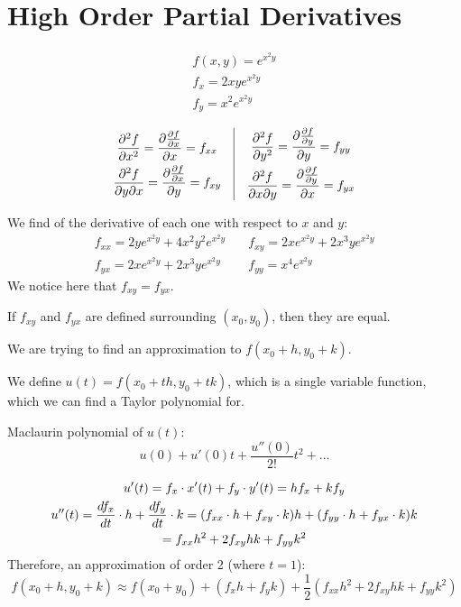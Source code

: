 \documentclass[00_complete]{subfiles}
\begin{document}
\section{High Order Partial Derivatives}
\begin{example}
    \begin{gather*}
        f(x,y)=e^{x^2y} \\
        f_x=2xye^{x^2y} \\
        f_y=x^2e^{x^2y}
    \end{gather*}
    \begin{symbols}
    $$
    \begin{gathered}
        \frac{\partial^2f}{\partial x^2}=\pdv{\pdv{f}{x}}{x}=f_{xx} \\
        \frac{\partial^2f}{\partial y\partial x}=\pdv{\pdv{f}{x}}{y}=f_{xy}
    \end{gathered}\quad \vline \quad
    \begin{gathered}
        \frac{\partial^2f}{\partial y^2}=\pdv{\pdv{f}{y}}{y}=f_{yy} \\
        \frac{\partial^2f}{\partial x\partial y}=\pdv{\pdv{f}{y}}{x}=f_{yx}
    \end{gathered}
    $$
    \end{symbols}
    We find of the derivative of each one with respect to $x$ and $y$:
    \begin{align*}
        f_{xx}=2ye^{x^2y}+4x^2y^2e^{x^2y} & \quad
        f_{xy}=2xe^{x^2y}+2x^3ye^{x^2y} \\
        f_{yx}=2xe^{x^2y}+2x^3ye^{x^2y} & \quad
        f_{yy}=x^4e^{x^2y}
    \end{align*}
    We notice here that $f_{xy}=f_{yx}$.
\end{example}
\begin{theorem}
    If $f_{xy}$ and $f_{yx}$ are defined surrounding $(x_0,y_0)$, then they are
    equal.
\end{theorem}
\begin{theorem}
    We are trying to find an approximation to $f(x_0+h,y_0+k)$.

    We define $u(t)=f(x_0+th,y_0+tk)$, which is a single variable function,
    which we can find a Taylor polynomial for.
    \begin{reminder}
        Maclaurin polynomial of $u(t)$:
        $$u(0)+u'(0)t+\frac{u''(0)}{2!}t^2+\dots$$
    \end{reminder}
    \begin{gather*}
        u'(t)=f_x\cdot x'(t)+f_y\cdot y'(t)=hf_x+kf_y \\
        u''(t)=\dv{f_x}{t}\cdot h + \dv{f_y}{t}\cdot k = (f_{xx}\cdot h +
        f_{xy}\cdot k)h+(f_{yy}\cdot h + f_{yx}\cdot k)k \\
        =f_{xx}h^2+2f_{xy}hk+f_{yy}k^2
    \end{gather*}
    Therefore, an approximation of order 2 (where $t=1$):
    $$f(x_0+h,y_0+k)\approx
    f(x_0+y_0)+(f_xh+f_yk)+\frac{1}{2}(f_{xx}h^2+2f_{xy}hk+f_{yy}k^2)$$
\end{theorem}
\end{document}
